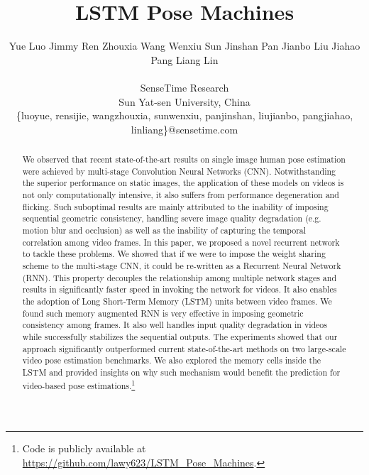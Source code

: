 \documentclass[10pt,twocolumn,letterpaper]{article}
\begin{document}
\title{LSTM Pose Machines}

\author{
Yue Luo \hspace{0.03in} Jimmy Ren \hspace{0.03in} Zhouxia Wang \hspace{0.03in} Wenxiu Sun \hspace{0.03in}
Jinshan Pan \hspace{0.03in} Jianbo Liu \hspace{0.03in} Jiahao Pang \hspace{0.03in} Liang Lin\\\\
SenseTime Research\\
Sun Yat-sen University, China\\
\{luoyue, rensijie, wangzhouxia, sunwenxiu, panjinshan, liujianbo, pangjiahao, linliang\}@sensetime.com\\
}


\maketitle
\thispagestyle{empty}

\begin{abstract}
   We observed that recent state-of-the-art results on single image human pose estimation were achieved by multi-stage Convolution Neural Networks (CNN). Notwithstanding the superior performance on static images, the application of these models on videos is not only computationally intensive, it also suffers from performance degeneration and flicking. Such suboptimal results are mainly attributed to the inability of imposing sequential geometric consistency, handling severe image quality degradation (e.g. motion blur and occlusion) as well as the inability of capturing the temporal correlation among video frames. In this paper, we proposed a novel recurrent network to tackle these problems. We showed that if we were to impose the weight sharing scheme to the multi-stage CNN, it could be re-written as a Recurrent Neural Network (RNN). This property decouples the relationship among multiple network stages and results in significantly faster speed in invoking the network for videos. It also enables the adoption of Long Short-Term Memory (LSTM) units between video frames. We found such memory augmented RNN is very effective in imposing geometric consistency among frames. It also well handles input quality degradation in videos while successfully stabilizes the sequential outputs. The experiments showed that our approach significantly outperformed current state-of-the-art methods on two large-scale video pose estimation benchmarks. We also explored the memory cells inside the LSTM and provided insights on why such mechanism would benefit the prediction for video-based pose estimations.\footnote{Code is publicly available at \url{https://github.com/lawy623/LSTM_Pose_Machines}.}
\end{abstract}
\end{document}
